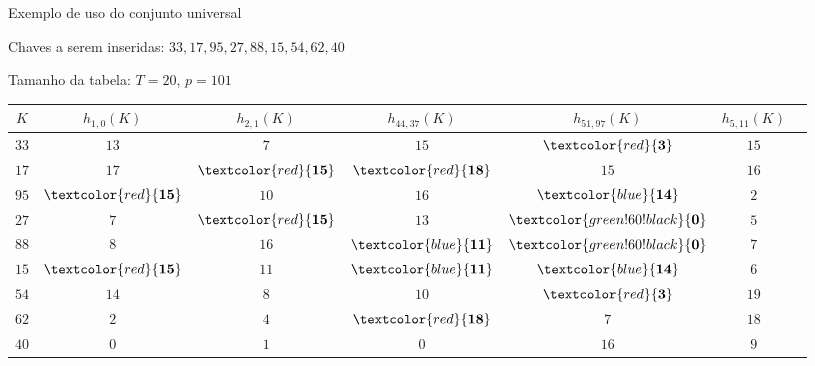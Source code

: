 \begin{frame}[fragile]{Exemplo de uso do conjunto universal}

    Chaves a serem inseridas: $33, 17, 95, 27, 88, 15, 54, 62, 40$

    Tamanho da tabela: $T = 20$, $p = 101$

    \begin{table}[H]
        \centering

        \begin{tabular}{ccccccc}
            \toprule
            $K$ & $h_{1,0}(K)$ & $h_{2,1}(K)$ & $h_{44,37}(K)$ & $h_{51,97}(K)$ & $h_{5,11}(K)$ \\
            \midrule
            $33$ & $13$ & $7$ & $15$ & $\textcolor{red}{\mathbf{3}}$ & $15$ \\
            $17$ & $17$ & $\textcolor{red}{\mathbf{15}}$ & $\textcolor{red}{\mathbf{18}}$ & $15$& $16$  \\
            $95$ & $\textcolor{red}{\mathbf{15}}$ & $10$ & $16$ & $\textcolor{blue}{\mathbf{14}}$ & $2$ \\
            $27$ & $7$ & $\textcolor{red}{\mathbf{15}}$ & $13$ & $\textcolor{green!60!black}{\mathbf{0}}$& $5$  \\
            $88$ & $8$ & $16$ & $\textcolor{blue}{\mathbf{11}}$ & $\textcolor{green!60!black}{\mathbf{0}}$ & $7$ \\
            $15$ & $\textcolor{red}{\mathbf{15}}$ & $11$ & $\textcolor{blue}{\mathbf{11}}$ & $\textcolor{blue}{\mathbf{14}}$ & $6$ \\
            $54$ & $14$ & $8$ & $10$ & $\textcolor{red}{\mathbf{3}}$ & $19$ \\
            $62$ & $2$ & $4$ & $\textcolor{red}{\mathbf{18}}$ & $7$ & $18$ \\
            $40$ & $0$ & $1$ & $0$ & $16$ & $9$ \\
            \bottomrule
        \end{tabular}
    \end{table}

\end{frame}

